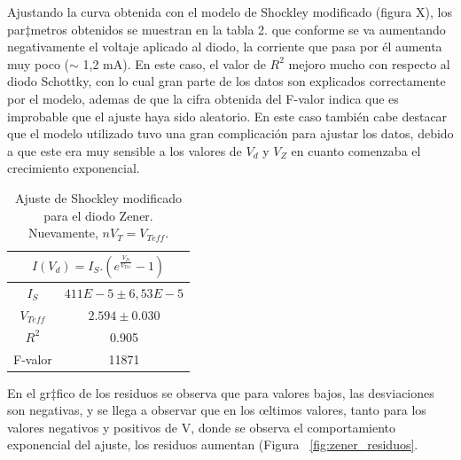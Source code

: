 \documentclass[twoside,twocolumn,a4paper]{article}
\begin{document}
Ajustando la curva obtenida con el modelo de Shockley modificado (figura X), los par‡metros obtenidos se muestran en la tabla 2. que conforme se va aumentando negativamente el voltaje aplicado al diodo, la corriente que pasa por \'el aumenta muy poco ($\sim$ 1,2 mA). En este caso, el valor de $R^2$ mejoro mucho con respecto al diodo Schottky, con lo cual gran parte de los datos son explicados correctamente por el modelo, ademas de que la cifra obtenida del F-valor indica que es improbable que el ajuste haya sido aleatorio. 
En este caso tambi\'en cabe destacar que el modelo utilizado tuvo una gran complicaci\'on para ajustar los datos, debido a que este era muy sensible a los valores de $V_{d}$ y $V_{Z}$ en cuanto comenzaba el crecimiento exponencial.

\begin{table}[h!]
\centering
\captionsetup{justification=centering}
\caption{Ajuste de Shockley modificado para el diodo Zener. Nuevamente, $nV_{T} = V_{Teff}$.}
\label{tab:zener}
\begin{tabular}{|c|c|}
\hline
\multicolumn{2}{|c|}{$I(V_d)=I_S . (e^\frac{V_D}{V_{Tee}}-1)$} \\ \hline
$I_S$                       & $411E-5\pm6,53E-5$                   \\ \hline
$V_{Teff}$                  & $2.594\pm0.030$                  \\ \hline
$R^2$                       & 0.905                              \\ \hline
F-valor                     & 11871                            \\ \hline
\end{tabular}
\end{table}

En el gr‡fico de los residuos se observa que para valores bajos, las desviaciones son negativas, y se llega a observar que en los œltimos valores, tanto para los valores negativos y positivos de V, donde se observa el comportamiento exponencial del ajuste, los residuos aumentan (Figura ~\ref{fig:zener_residuos}.
\end{document}
